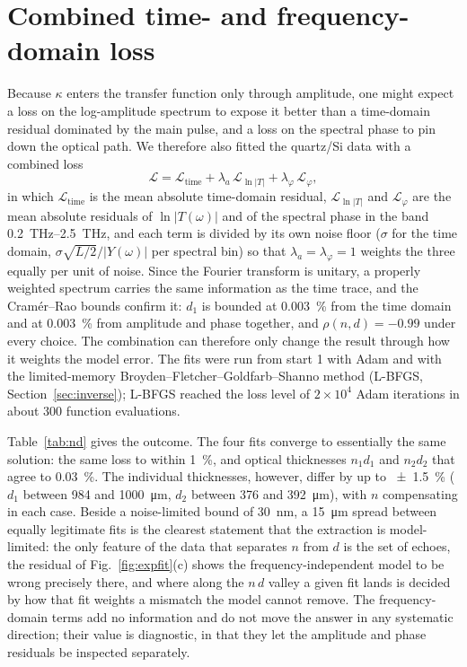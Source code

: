 \documentclass{optica-article}
\newcommand{\kap}{\kappa}
\newcommand{\Lt}{\mathcal{L}}
\begin{document}
\section{Combined time- and frequency-domain loss}\label{sec:loss}
Because $\kap$ enters the transfer function only through amplitude, one might expect a loss on the log-amplitude spectrum to expose it better than a time-domain residual dominated by the main pulse, and a loss on the spectral phase to pin down the optical path. We therefore also fitted the quartz/Si data with a combined loss
\begin{equation}
  \Lt=\Lt_{\mathrm{time}}+\lambda_a\,\Lt_{\ln|T|}+\lambda_\varphi\,\Lt_{\varphi},
  \label{eq:combined}
\end{equation}
in which $\Lt_{\mathrm{time}}$ is the mean absolute time-domain residual, $\Lt_{\ln|T|}$ and $\Lt_\varphi$ are the mean absolute residuals of $\ln|T(\omega)|$ and of the spectral phase in the band \SIrange{0.2}{2.5}{THz}, and each term is divided by its own noise floor ($\sigma$ for the time domain, $\sigma\sqrt{L/2}/|Y(\omega)|$ per spectral bin) so that $\lambda_a=\lambda_\varphi=1$ weights the three equally per unit of noise. Since the Fourier transform is unitary, a properly weighted spectrum carries the same information as the time trace, and the Cram\'er--Rao bounds confirm it: $d_1$ is bounded at \SI{0.003}{\percent} from the time domain and at \SI{0.003}{\percent} from amplitude and phase together, and $\rho(n,d)=-0.99$ under every choice. The combination can therefore only change the result through how it weights the model error. The fits were run from start 1 with Adam and with the limited-memory Broyden--Fletcher--Goldfarb--Shanno method (L-BFGS, Section~\ref{sec:inverse}); L-BFGS reached the loss level of $2\times10^4$ Adam iterations in about 300 function evaluations.

Table~\ref{tab:nd} gives the outcome. The four fits converge to essentially the same solution: the same loss to within \SI{1}{\percent}, and optical thicknesses $n_1d_1$ and $n_2d_2$ that agree to \SI{0.03}{\percent}. The individual thicknesses, however, differ by up to \SI{\pm1.5}{\percent} ($d_1$ between 984 and \SI{1000}{\micro\metre}, $d_2$ between 376 and \SI{392}{\micro\metre}), with $n$ compensating in each case. Beside a noise-limited bound of \SI{30}{\nano\metre}, a \SI{15}{\micro\metre} spread between equally legitimate fits is the clearest statement that the extraction is model-limited: the only feature of the data that separates $n$ from $d$ is the set of echoes, the residual of Fig.~\ref{fig:expfit}(c) shows the frequency-independent model to be wrong precisely there, and where along the $n\,d$ valley a given fit lands is decided by how that fit weights a mismatch the model cannot remove. The frequency-domain terms add no information and do not move the answer in any systematic direction; their value is diagnostic, in that they let the amplitude and phase residuals be inspected separately.
\end{document}
